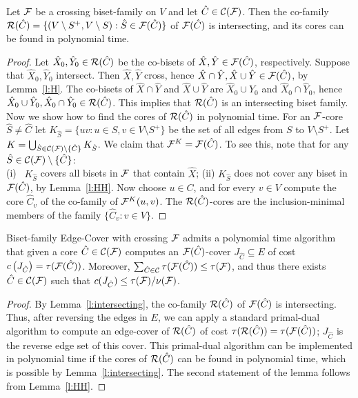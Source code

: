 \begin{lemma} \label{l:intersecting}
Let ${\cal F}$ be a crossing biset-family on $V$ and let $\hat{C} \in {\cal C}({\cal F})$.
Then the co-family ${\cal R}(\hat{C})=\{(V \setminus S^+, V \setminus S): \hat{S} \in {\cal F}(\hat{C})\}$
of ${\cal F}(\hat{C})$ is intersecting, and its cores can be found in polynomial time.
\end{lemma}
\begin{proof}
Let $\hat{X}_0,\hat{Y}_0 \in {\cal R}(\hat{C})$ be the co-bisets of $\hat{X},\hat{Y} \in {\cal F}(\hat{C})$,
respectively. Suppose that $\hat{X}_0,\hat{Y}_0$ intersect.
Then $\hat{X},\hat{Y}$ cross, hence $\hat{X} \cap \hat{Y}, \hat{X} \cup \hat{Y} \in {\cal F}(\hat{C})$,
by Lemma~\ref{l:H}. The co-bisets of $\hat{X} \cap \hat{Y}$ and $\hat{X} \cup \hat{Y}$ are
$\hat{X}_0 \cup \hat{Y}_0$ and $\hat{X}_0 \cap \hat{Y}_0$,
hence $\hat{X}_0 \cup \hat{Y}_0,\hat{X}_0 \cap \hat{Y}_0 \in {\cal R}(\hat{C})$.
This implies that ${\cal R}(\hat{C})$ is an intersecting biset family. 
Now we show how to find the cores of ${\cal R}(\hat{C})$ in polynomial time.
For an ${\cal F}$-core $\hat{S} \neq \hat{C}$ let 
$K_{\hat{S}}=\{uv: u \in S,v \in V \setminus S^+\}$ be the set of all edges 
from $S$ to $V \setminus S^+$. 
Let $K=\bigcup_{\hat{S} \in {\cal C}({\cal F}) \setminus \{\hat{C}\}} K_{\hat{S}}$. 
We claim that ${\cal F}^K={\cal F}(\hat{C})$.
To see this, note that for any $\hat{S} \in {\cal C}({\cal F}) \setminus \{\hat{C}\}$: \\ 
(i) \ $K_{\hat{S}}$ covers all bisets in ${\cal F}$ that contain $\hat{X}$; 
(ii)  $K_{\hat{S}}$ does not cover any biset in ${\cal F}(\hat{C})$, by Lemma~\ref{l:HH}. 
Now choose $u \in C$, and for every $v \in V$ compute the core $\hat{C}_v$ 
of the co-family of ${\cal F}^K(u,v)$. 
The ${\cal R}(\hat{C})$-cores are the inclusion-minimal members of the family $\{\hat{C}_v: v \in V\}$. 
\end{proof}

\begin{corollary} \label{c:S-greedy}
{\sf Biset-family Edge-Cover} with crossing ${\cal F}$
admits a polynomial time algorithm that given a core $\hat{C} \in {\cal C}({\cal F})$ 
computes an ${\cal F}(\hat{C})$-cover $J_{\hat{C}} \subseteq E$ of cost 
$c\left(J_{\hat{C}}\right)=\tau({\cal F}(\hat{C}))$.
Moreover, $\sum_{\hat{C} \in {\cal C}} \tau({\cal F}(\hat{C})) \leq \tau({\cal F})$, and thus
there exists $\hat{C} \in {\cal C}({\cal F})$ such that $c(J_{\hat{C}}) \leq \tau({\cal F})/\nu({\cal F})$.
\end{corollary}
\begin{proof}
By Lemma~\ref{l:intersecting}, the co-family 
${\cal R}(\hat{C})$ of ${\cal F}(\hat{C})$ is intersecting.
Thus, after reversing the edges in $E$, we can apply a standard primal-dual algorithm to compute an 
edge-cover of ${\cal R}(\hat{C})$ of cost $\tau({\cal R}(\hat{C}))=\tau({\cal F}(\hat{C}))$; 
$J_{\hat{C}}$ is the reverse edge set of this cover.
This primal-dual algorithm can be implemented in polynomial time if the cores of ${\cal R}(\hat{C})$
can be found in polynomial time, which is possible by Lemma~\ref{l:intersecting}.
The second statement of the lemma follows from Lemma~\ref{l:HH}.
\end{proof}

